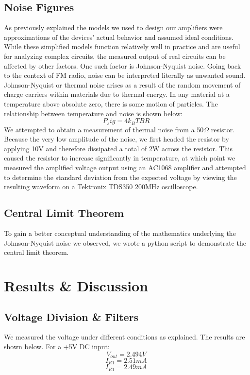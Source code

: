 \documentclass[11pt]{article}
\begin{document}
  \subsection{Noise Figures}
  As previously explained the models we used to design our amplifiers were approximations of the devices' actual behavior and assumed ideal conditions. While these simplified models function relatively well in practice and are useful for analyzing complex circuits, the measured output of real circuits can be affected by other factors.  One such factor is Johnson-Nyquist noise.  Going back to the context of FM radio, noise can be interpreted literally as unwanted sound.  Johnson-Nyquist or thermal noise arises as a result of the random movement of charge carriers within materials due to thermal energy. In any material at a temperature above absolute zero, there is some motion of particles.  The relationship between temperature and noise is shown below:
  $$P_sig = 4k_BTBR$$
  We attempted to obtain a measurement of thermal noise from a 50$\Omega$ resistor.  Because the very low amplitude of the noise, we first headed the resistor by applying 10V and therefore dissipated a total of 2W across the resistor.  This caused the resistor to increase significantly in temperature, at which point we measured the amplified voltage output using an AC1068 amplifier and attempted to determine the standard deviation from the expected voltage by viewing the resulting waveform on a Tektronix TDS350 200MHz oscilloscope.
  
  \subsection{Central Limit Theorem}
  To gain a better conceptual understanding of the mathematics underlying the Johnson-Nyquist noise we observed, we wrote a python script to demonstrate the central limit theorem.

\section{Results \& Discussion}
  \subsection{Voltage Division \& Filters}
  We measured the voltage under different conditions as explained.  The results are shown below.
  For a +5V DC input:
  $$V_{out} =  2.494 V$$
  $$I_{R1} = 2.51 mA$$
  $$I_{R1} = 2.49 mA$$
  
\end{document}
